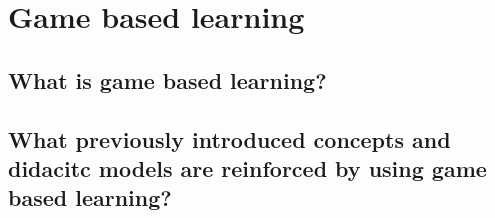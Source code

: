 \chapter{Game based learning}



\section{What is game based learning?}

\section{What previously introduced concepts and didacitc models are reinforced by using game based learning?}